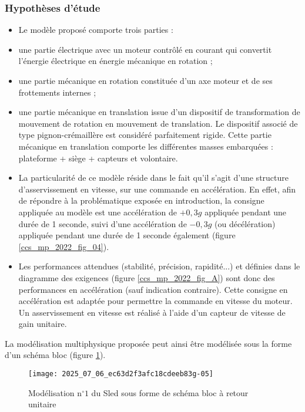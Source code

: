 \subsubsection*{Hypothèses d'étude}
\begin{itemize}
  \item Le modèle proposé comporte trois parties :
  \item une partie électrique avec un moteur contrôlé en courant qui convertit l'énergie électrique en énergie mécanique en rotation ;
  \item une partie mécanique en rotation constituée d'un axe moteur et de ses frottements internes ;
  \item une partie mécanique en translation issue d'un dispositif de transformation de mouvement de rotation en mouvement de translation. Le dispositif associé de type pignon-crémaillère est considéré parfaitement rigide. Cette partie mécanique en translation comporte les différentes masses embarquées : plateforme + siège + capteurs et volontaire.
  \item La particularité de ce modèle réside dans le fait qu'il s'agit d'une structure d'asservissement en vitesse, sur une commande en accélération. En effet, afin de répondre à la problématique exposée en introduction, la consigne appliquée au modèle est une accélération de $+0,3 g$ appliquée pendant une durée de 1 seconde, suivi d'une accélération de $-0,3 g$ (ou décélération) appliquée pendant une durée de 1 seconde également (figure \ref{ccs_mp_2022_fig_04}).
  \item Les performances attendues (stabilité, précision, rapidité...) et définies dans le diagramme des exigences (figure \ref{ccs_mp_2022_fig_A}) sont donc des performances en accélération (sauf indication contraire). Cette consigne en accélération est adaptée pour permettre la commande en vitesse du moteur. Un asservissement en vitesse est réalisé à l'aide d'un capteur de vitesse de gain unitaire.
\end{itemize}


La modélisation multiphysique proposée peut ainsi être modélisée sous la forme d'un schéma bloc (figure \ref{ccs_mp_2022_fig_07}).

\begin{figure}[!h]
\centering
\texttt{[image: 2025\_07\_06\_ec63d2f3afc18cdeeb83g-05]}
\caption{\label{ccs_mp_2022_fig_07}Modélisation $\mathrm{n}^{\circ} 1$ du Sled sous forme de schéma bloc à retour unitaire}
\end{figure}


